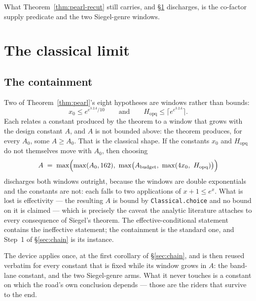 \documentclass[11pt]{amsart}
\theoremstyle{remark}
\begin{document}
What Theorem~\ref{thm:pearl-recut} still carries, and \S\ref{sec:limit}
discharges, is the co-factor supply predicate and the two Siegel-genre windows.

\section{The classical limit}\label{sec:limit}

\subsection{The containment}
Two of Theorem~\ref{thm:pearl}'s eight hypotheses are windows rather than
bounds:
\[
x_0 \le e^{e^{3.2A}/10}
\qquad\text{and}\qquad
H_{\mathrm{opq}} \le \bigl\lceil e^{e^{3.2A}}\bigr\rceil .
\]
Each relates a constant produced by the theorem to a window that grows
with the design constant $A$, and $A$ is not bounded above: the theorem
produces, for every $A_0$, some $A \ge A_0$. That is the classical shape.
If the constants $x_0$ and $H_{\mathrm{opq}}$ do not themselves move with
$A_0$, then choosing
\[
A \;=\; \max\Bigl(\max(A_0, 162),\ \max\bigl(A_{\mathrm{budget}},\
\max(4x_0,\ H_{\mathrm{opq}})\bigr)\Bigr)
\]
discharges both windows outright, because the windows are double
exponentials and the constants are not: each falls to two applications of
$x + 1 \le e^{x}$. What is lost is effectivity --- the resulting $A$ is
bound by \texttt{Classical.choice} and no bound on it is claimed --- which
is precisely the caveat the analytic literature attaches to every
consequence of Siegel's theorem. The effective-conditional statement
contains the ineffective statement; the containment is the standard one,
and Step~1 of \S\ref{sec:chain} is its instance.

The device applies once, at the first corollary of \S\ref{sec:chain}, and is
then reused verbatim for every constant that is fixed while its window grows in
$A$: the band-lane constant, and the two Siegel-genre arms. What it never
touches is a constant on which the road's own conclusion depends --- those are
the riders that survive to the end.
\end{document}
